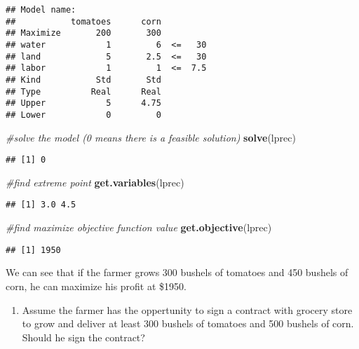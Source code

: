 \documentclass[]{article}
\newenvironment{Shaded}{\begin{snugshade}}{\end{snugshade}}
\newcommand{\KeywordTok}[1]{\textcolor[rgb]{0.13,0.29,0.53}{\textbf{#1}}}
\newcommand{\CommentTok}[1]{\textcolor[rgb]{0.56,0.35,0.01}{\textit{#1}}}
\newcommand{\NormalTok}[1]{#1}
\providecommand{\tightlist}{%
  \setlength{\itemsep}{0pt}\setlength{\parskip}{0pt}}
\begin{document}
\begin{verbatim}
## Model name: 
##           tomatoes      corn         
## Maximize       200       300         
## water            1         6  <=   30
## land             5       2.5  <=   30
## labor            1         1  <=  7.5
## Kind           Std       Std         
## Type          Real      Real         
## Upper            5      4.75         
## Lower            0         0
\end{verbatim}

\begin{Shaded}
\begin{Highlighting}[]
\CommentTok{#solve the model (0 means there is a feasible solution)}
\KeywordTok{solve}\NormalTok{(lprec)}
\end{Highlighting}
\end{Shaded}

\begin{verbatim}
## [1] 0
\end{verbatim}

\begin{Shaded}
\begin{Highlighting}[]
\CommentTok{#find extreme point}
\KeywordTok{get.variables}\NormalTok{(lprec)}
\end{Highlighting}
\end{Shaded}

\begin{verbatim}
## [1] 3.0 4.5
\end{verbatim}

\begin{Shaded}
\begin{Highlighting}[]
\CommentTok{#find maximize objective function value}
\KeywordTok{get.objective}\NormalTok{(lprec)}
\end{Highlighting}
\end{Shaded}

\begin{verbatim}
## [1] 1950
\end{verbatim}

We can see that if the farmer grows 300 bushels of tomatoes and 450
bushels of corn, he can maximize his profit at \$1950.

\begin{enumerate}
\def\labelenumi{(\alph{enumi})}
\setcounter{enumi}{1}
\tightlist
\item
  Assume the farmer has the oppertunity to sign a contract with grocery
  store to grow and deliver at least 300 bushels of tomatoes and 500
  bushels of corn. Should he sign the contract?
\end{enumerate}
\end{document}
